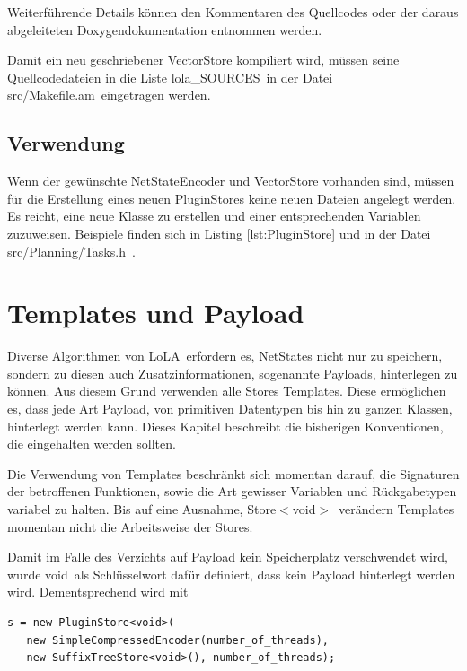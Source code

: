 \documentclass[12pt,a4paper,titlepage]{scrartcl}
\renewcommand \( {\left (}
\renewcommand \) {\right )}
\renewcommand \[ {\left [}
\renewcommand \] {\right ]}
\newcommand \Flqq {\flqq\ }
\newcommand{\lola}{\frqq LoLA\Flqq}
\begin{document}
Weiterführende Details können den Kommentaren des Quellcodes oder der daraus abgeleiteten Doxygendokumentation entnommen werden.

Damit ein neu geschriebener VectorStore kompiliert wird, müssen seine Quellcodedateien in die Liste \frqq lola\_SOURCES\Flqq in der Datei \frqq src/Makefile.am\Flqq eingetragen werden.

\subsection{Verwendung}
Wenn der gewünschte NetStateEncoder und VectorStore vorhanden sind, müssen für die Erstellung eines neuen PluginStores keine neuen Dateien angelegt werden. Es reicht, eine neue Klasse zu erstellen und einer entsprechenden Variablen zuzuweisen. Beispiele finden sich in Listing \ref{lst:PluginStore} und in der Datei \frqq src/Planning/Tasks.h\Flqq.

\section{Templates und Payload}
Diverse Algorithmen von \lola erfordern es, NetStates nicht nur zu speichern, sondern zu diesen auch Zusatzinformationen, sogenannte Payloads, hinterlegen zu können. Aus diesem Grund verwenden alle Stores Templates. Diese ermöglichen es, dass jede Art Payload, von primitiven Datentypen bis hin zu ganzen Klassen, hinterlegt werden kann. Dieses Kapitel beschreibt die bisherigen Konventionen, die eingehalten werden sollten.

Die Verwendung von Templates beschränkt sich momentan darauf, die Signaturen der betroffenen Funktionen, sowie die Art gewisser Variablen und Rückgabetypen variabel zu halten. Bis auf eine Ausnahme,
\frqq Store$<$void$>$\Flqq verändern Templates momentan nicht die Arbeitsweise der Stores.

Damit im Falle des Verzichts auf Payload kein Speicherplatz verschwendet wird, wurde \frqq void\Flqq als Schlüsselwort dafür definiert, dass kein Payload hinterlegt werden wird. Dementsprechend wird mit

\begin{center}
\begin{minipage}{0.7\textwidth}
\lstset{language=C++}
\begin{lstlisting}[label=lst:PluginStore,caption={Erstellung eines PluginStores}]
s = new PluginStore<void>(
   new SimpleCompressedEncoder(number_of_threads),
   new SuffixTreeStore<void>(), number_of_threads);\end{lstlisting}
\end{minipage}
\end{center}
\end{document}
